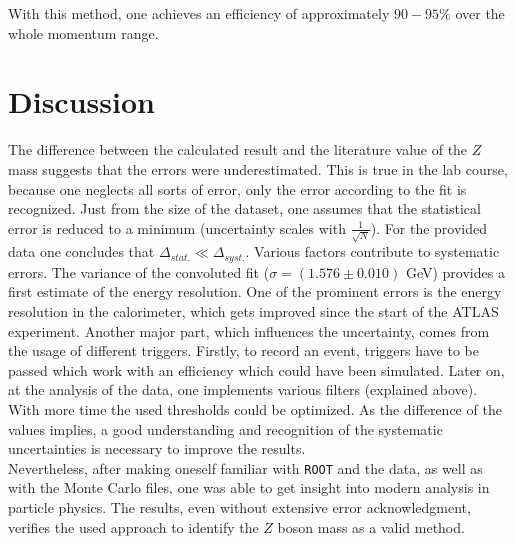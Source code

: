 \documentclass[12pt, a4paper, bibliography=totoc]{scrartcl}
\begin{document}
\begin{multicols}{2}
With this method, one achieves an efficiency of approximately $90-95\%$ over the whole momentum range.

\section{Discussion}
The difference between the calculated result and the literature value of the $Z$ mass suggests that the errors were underestimated.
This is true in the lab course, because one neglects all sorts of error, only the error according to the fit is recognized.
Just from the size of the dataset, one assumes that the statistical error is reduced to a minimum (uncertainty scales with $\frac{1}{\sqrt{N}}$).
For the provided data one concludes that $\Delta_{stat.} \ll \Delta_{syst.}$.
Various factors contribute to systematic errors. 
The variance of the convoluted fit ($\sigma = (1.576 \pm 0.010)$ \si{GeV}) provides a first estimate of the energy resolution.
One of the prominent errors is the energy resolution in the calorimeter, which gets improved since the start of the ATLAS experiment. 
Another major part, which influences the uncertainty, comes from the usage of different triggers.
Firstly, to record an event, triggers have to be passed which work with an efficiency which could have been simulated. 
Later on, at the analysis of the data, one implements various filters (explained above).
With more time the used thresholds could be optimized.
As the difference of the values implies, a good understanding and recognition of the systematic uncertainties is necessary to improve the results.\\

Nevertheless, after making oneself familiar with \verb*+ROOT+ and the data, as well as with the Monte Carlo files, one was able to get insight into modern analysis in particle physics. 
The results, even without extensive error acknowledgment, verifies the used approach to identify the $Z$ boson mass as a valid method.  

\nocite{*}
\appendix
\printbibliography
\end{multicols}
\end{document}
